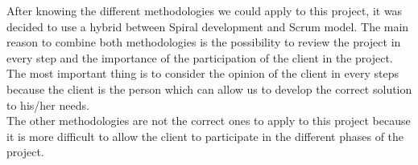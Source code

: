 After knowing the different methodologies we could apply to this project, it was decided to use a hybrid between Spiral development and Scrum model. The main reason to combine both methodologies is the possibility to review the project in every step and the importance of the participation of the client in the project. The most important thing is to consider the opinion of the client in every steps because the client is the person which can allow us to develop the correct solution to his/her needs.\\

The other methodologies are not the correct ones to apply to this project because it is more difficult to allow the client to participate in the different phases of the project.

\newpage
\newpage